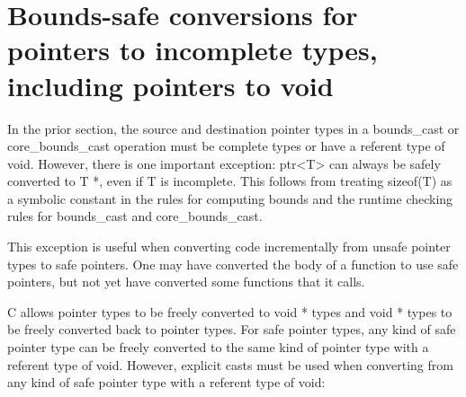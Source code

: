 \section{Bounds-safe conversions for pointers to incomplete types, including pointers to void}

In the prior section, the source and destination pointer types in a
bounds\_cast or core\_bounds\_cast operation must be complete types or
have a referent type of void. However, there is one important exception:
ptr\textless{}T\textgreater{} can always be safely converted to T *,
even if T is incomplete. This follows from treating sizeof(T) as a
symbolic constant in the rules for computing bounds and the runtime
checking rules for bounds\_cast and core\_bounds\_cast.

This exception is useful when converting code incrementally from unsafe
pointer types to safe pointers. One may have converted the body of a
function to use safe pointers, but not yet have converted some functions
that it calls.

C allows pointer types to be freely converted to void * types and void *
types to be freely converted back to pointer types. For safe pointer
types, any kind of safe pointer type can be freely converted to the same
kind of pointer type with a referent type of void. However, explicit
casts must be used when converting from any kind of safe pointer type
with a referent type of void:

